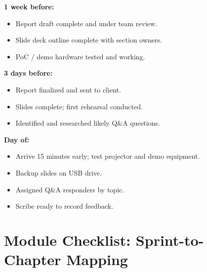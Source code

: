 \documentclass[11pt,letterpaper]{article}
\begin{document}
\textbf{1 week before:}
\begin{itemize}[nosep,leftmargin=1.5em]
\item Report draft complete and under team review.
\item Slide deck outline complete with section owners.
\item PoC / demo hardware tested and working.
\end{itemize}

\textbf{3 days before:}
\begin{itemize}[nosep,leftmargin=1.5em]
\item Report finalized and sent to client.
\item Slides complete; first rehearsal conducted.
\item Identified and researched likely Q\&A questions.
\end{itemize}

\textbf{Day of:}
\begin{itemize}[nosep,leftmargin=1.5em]
\item Arrive 15 minutes early; test projector and demo equipment.
\item Backup slides on USB drive.
\item Assigned Q\&A responders by topic.
\item Scribe ready to record feedback.
\end{itemize}


\section{Module Checklist: Sprint-to-Chapter Mapping}
\end{document}
